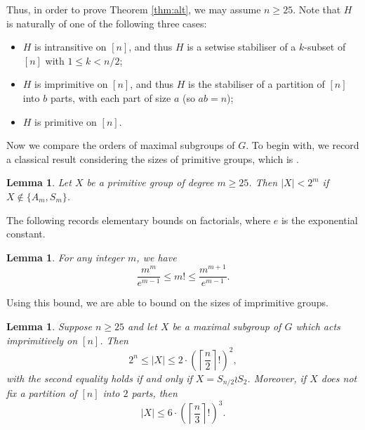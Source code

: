 \documentclass[twoside,a4paper,reqno,11pt]{amsart}
\newcommand{\<}{\langle}
\renewcommand{\>}{\rangle}
\newcommand{\leqs}{\leqslant}
\newcommand{\geqs}{\geqslant}
\newtheorem{lem}[thm]{Lemma}
\theoremstyle{definition}
\begin{document}
	Thus, in order to prove Theorem \ref{thm:alt}, we may assume $n\geqs 25$. Note that $H$ is naturally of one of the following three cases:
	
	\begin{itemize}\addtolength{\itemsep}{0.2\baselineskip}
		\item[{\rm (a)}] $H$ is intransitive on $[n]$, and thus $H$ is a setwise stabiliser of a $k$-subset of $[n]$ with $1\leqs k < n/2$;
		\item[{\rm (b)}] $H$ is imprimitive on $[n]$, and thus $H$ is the stabiliser of a partition of $[n]$ into $b$ parts, with each part of size $a$ (so $ab = n$);
		\item[{\rm (c)}] $H$ is primitive on $[n]$.
	\end{itemize}
	
	Now we compare the orders of maximal subgroups of $G$. To begin with, we record a classical result considering the sizes of primitive groups, which is \cite[Corollary 1.2]{M_prim_order}.
	
	\begin{lem}
		\label{l:max_size_prim}
		Let $X$ be a primitive group of degree $m\geqs 25$. Then $|X| < 2^m$ if $X\notin\{A_m,S_m\}$.
	\end{lem}
	
	The following records elementary bounds on factorials, where $e$ is the exponential constant.
	
	\begin{lem}
		\label{l:max_factorial}
		For any integer $m$, we have
		\begin{equation*}
		\frac{m^m}{e^{m-1}}\leqs m!\leqs \frac{m^{m+1}}{e^{m-1}}.
		\end{equation*}
	\end{lem}
	
	Using this bound, we are able to bound on the sizes of imprimitive groups.
	
	\begin{lem}
		\label{l:max_size_imprim}
		Suppose $n\geqs 25$ and let $X$ be a maximal subgroup of $G$ which acts imprimitively on $[n]$. Then
		\begin{equation}
		\label{e:max_imprim_m}
		2^n\leqs |X|\leqs 2\cdot \left(\left\lceil\frac{n}{2}\right\rceil!\right)^2,
		\end{equation}
		with the second equality holds if and only if $X = S_{n/2}\wr S_2$. Moreover, if $X$ does not fix a partition of $[n]$ into $2$ parts, then
		\begin{equation}\label{e:max_imprim_3_parts}
		|X| \leqs 6\cdot \left(\left\lceil\frac{n}{3}\right\rceil!\right)^3.
		\end{equation}
	\end{lem}
	
\end{document}
